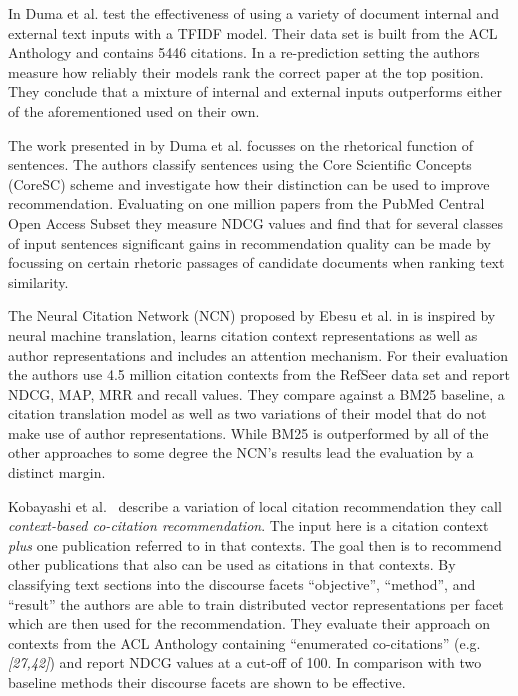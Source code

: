 In \cite{Duma2014} Duma et al. test the effectiveness of using a variety of document internal and external text inputs with a TFIDF model. Their data set is built from the ACL Anthology and contains 5446 citations. In a re-prediction setting the authors measure how reliably their models rank the correct paper at the top position. %
They conclude that a mixture of internal and external inputs outperforms either of the aforementioned used on their own.

The work presented in \cite{Duma2016} by Duma et al. focusses on the rhetorical function of sentences. The authors classify sentences using the Core Scientific Concepts (CoreSC) scheme and investigate how their distinction can be used to improve recommendation. Evaluating on one million papers from the PubMed Central Open Access Subset they measure NDCG values and find that for several classes of input sentences significant gains in recommendation quality can be made by focussing on certain rhetoric passages of candidate documents when ranking text similarity.

The Neural Citation Network (NCN) proposed by Ebesu et al. in \cite{Ebesu2017} is inspired by neural machine translation, learns citation context representations as well as author representations and includes an attention mechanism. For their evaluation the authors use 4.5 million citation contexts from the RefSeer data set and report NDCG, MAP, MRR and recall values. They compare against a BM25 baseline, a citation translation model as well as two variations of their model that do not make use of author representations. While BM25 is outperformed by all of the other approaches to some degree the NCN's results lead the evaluation by a distinct margin.

Kobayashi et al.~\cite{Kobayashi2018} describe a variation of local citation recommendation they call \emph{context-based co-citation recommendation}. The input here is a citation context \emph{plus} one publication referred to in that contexts. The goal then is to recommend other publications that also can be used as citations in that contexts. By classifying text sections into the discourse facets ``objective'', ``method'', and ``result'' the authors are able to train distributed vector representations per facet which are then used for the recommendation. They evaluate their approach on contexts from the ACL Anthology containing ``enumerated co-citations'' (e.g. \emph{[27,42]}) and report NDCG values at a cut-off of 100. In comparison with two baseline methods their discourse facets are shown to be effective.

